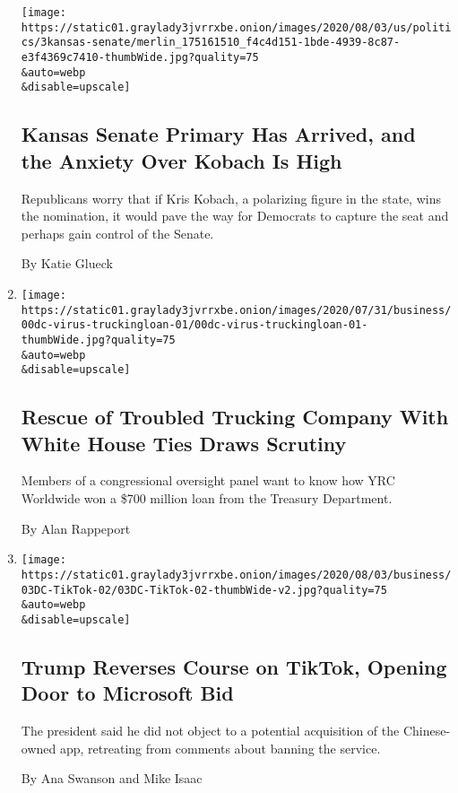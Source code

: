 \begin{enumerate}
  \texttt{[image: https://static01.graylady3jvrrxbe.onion/images/2020/08/03/us/politics/3kansas-senate/merlin\_175161510\_f4c4d151-1bde-4939-8c87-e3f4369c7410-thumbWide.jpg?quality=75\\\&auto=webp\\\&disable=upscale]}

  \hypertarget{kansas-senate-primary-has-arrived-and-the-anxiety-over-kobach-is-high}{%
  \subsection{Kansas Senate Primary Has Arrived, and the Anxiety Over
  Kobach Is
  High}\label{kansas-senate-primary-has-arrived-and-the-anxiety-over-kobach-is-high}}

  Republicans worry that if Kris Kobach, a polarizing figure in the
  state, wins the nomination, it would pave the way for Democrats to
  capture the seat and perhaps gain control of the Senate.

  By Katie Glueck
\item
  \href{/2020/08/03/us/politics/yrc-coronavirus-relief-funds.html}{}

  \texttt{[image: https://static01.graylady3jvrrxbe.onion/images/2020/07/31/business/00dc-virus-truckingloan-01/00dc-virus-truckingloan-01-thumbWide.jpg?quality=75\\\&auto=webp\\\&disable=upscale]}

  \hypertarget{rescue-of-troubled-trucking-company-with-white-house-ties-draws-scrutiny-1}{%
  \subsection{Rescue of Troubled Trucking Company With White House Ties
  Draws
  Scrutiny}\label{rescue-of-troubled-trucking-company-with-white-house-ties-draws-scrutiny-1}}

  Members of a congressional oversight panel want to know how YRC
  Worldwide won a \$700 million loan from the Treasury Department.

  By Alan Rappeport
\item
  \href{/2020/08/03/technology/trump-tiktok-microsoft.html}{}

  \texttt{[image: https://static01.graylady3jvrrxbe.onion/images/2020/08/03/business/03DC-TikTok-02/03DC-TikTok-02-thumbWide-v2.jpg?quality=75\\\&auto=webp\\\&disable=upscale]}

  \hypertarget{trump-reverses-course-on-tiktok-opening-door-to-microsoft-bid}{%
  \subsection{Trump Reverses Course on TikTok, Opening Door to Microsoft
  Bid}\label{trump-reverses-course-on-tiktok-opening-door-to-microsoft-bid}}

  The president said he did not object to a potential acquisition of the
  Chinese-owned app, retreating from comments about banning the service.

  By Ana Swanson and Mike Isaac
\end{enumerate}

